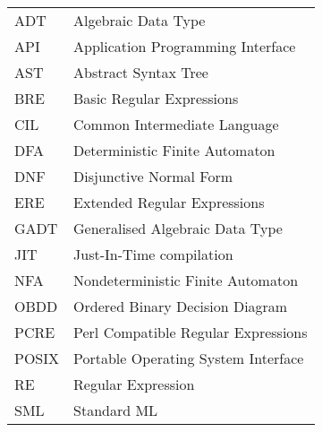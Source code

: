\begin{tabular}{ll}
   ADT & Algebraic Data Type \\
   API & Application Programming Interface \\
   AST & Abstract Syntax Tree \\
   BRE & Basic Regular Expressions \\
   CIL & Common Intermediate Language \\
   DFA & Deterministic Finite Automaton \\
   DNF & Disjunctive Normal Form \\
   ERE & Extended Regular Expressions \\
   GADT & Generalised Algebraic Data Type \\
   JIT & Just-In-Time compilation \\
   NFA & Nondeterministic Finite Automaton \\
   OBDD & Ordered Binary Decision Diagram \\
   PCRE & Perl Compatible Regular Expressions \\
   POSIX & Portable Operating System Interface \\
   RE & Regular Expression \\
   SML & Standard ML \\
\end{tabular}


